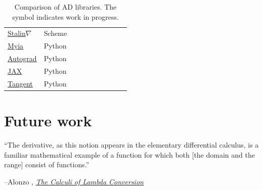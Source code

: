 \documentclass[12pt,initial,twoside,maitrise]{dms}
\newcommand{\wmark}{\textcolor{orange}{\ding{45}}}
\newcommand{\cmark}{\textcolor{green!80!black}{\ding{51}}}
\newcommand{\xmark}{\textcolor{red}{\ding{55}}}
\numberwithin{equation}{section}
\numberwithin{table}{chapter}
\numberwithin{figure}{chapter}
\begin{document}
\begin{table}
\begin{tabular}{llllllllll}
\href{https://github.com/Functional-AutoDiff/STALINGRAD}{Stalin$\nabla$}         & Scheme  & \xmark & \cmark & \xmark & \xmark & \xmark & \xmark & \xmark & \xmark \\
\href{https://github.com/mila-iqia/myia}{Myia}                                   & Python  & \cmark & \cmark & \cmark & \cmark & \xmark & \xmark & \xmark & \wmark \\
\href{https://github.com/HIPS/autograd/}{Autograd}                               & Python  & \xmark & \cmark & \xmark & \xmark & \xmark & \xmark & \xmark & \xmark \\
\href{https://github.com/google/jax}{JAX}                                        & Python  & \xmark & \cmark & \cmark & \cmark & \xmark & \xmark & \xmark & \wmark \\
\href{https://github.com/google/tangent}{Tangent}                                & Python  & \xmark & \cmark & \xmark & \xmark & \xmark & \xmark & \xmark & \xmark \\

\end{tabular}
\caption{\label{tab:ad_comparison} Comparison of AD libraries. The \wmark symbol indicates work in progress.}
\end{table}

\vspace{-20pt}\section{Future work}\label{sec:future-work}


\vspace{2pt}\setlength{\epigraphwidth}{0.65\textwidth}
\epigraph{``The derivative, as this notion appears in the elementary differential calculus, is a familiar mathematical example of a function for which both [the domain and the range] consist of functions.''}{\begin{flushright}--Alonzo \citet{church1985calculi}, \href{https://archive.org/details/AnnalsOfMathematicalStudies6ChurchAlonzoTheCalculiOfLambdaConversionPrincetonUniversityPress1941}{\textit{The Calculi of Lambda Conversion}}\end{flushright}}
\end{document}

